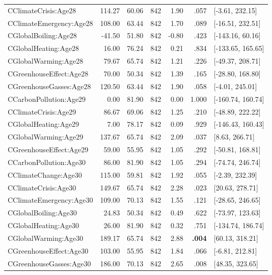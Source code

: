 \begin{table}[ht]
\begin{tabular}{lrrrrrl}
  CClimateCrisis:Age28 & 114.27 & 60.06 & 842 & 1.90 & .057 & [-3.61, 232.15] \\ 
  CClimateEmergency:Age28 & 108.00 & 63.44 & 842 & 1.70 & .089 & [-16.51, 232.51] \\ 
  CGlobalBoiling:Age28 & -41.50 & 51.80 & 842 & -0.80 & .423 & [-143.16, 60.16] \\ 
  CGlobalHeating:Age28 & 16.00 & 76.24 & 842 & 0.21 & .834 & [-133.65, 165.65] \\ 
  CGlobalWarming:Age28 & 79.67 & 65.74 & 842 & 1.21 & .226 & [-49.37, 208.71] \\ 
  CGreenhouseEffect:Age28 & 70.00 & 50.34 & 842 & 1.39 & .165 & [-28.80, 168.80] \\ 
  CGreenhouseGasses:Age28 & 120.50 & 63.44 & 842 & 1.90 & .058 & [-4.01, 245.01] \\ 
  CCarbonPollution:Age29 & 0.00 & 81.90 & 842 & 0.00 & 1.000 & [-160.74, 160.74] \\ 
  CClimateCrisis:Age29 & 86.67 & 69.06 & 842 & 1.25 & .210 & [-48.89, 222.22] \\ 
  CGlobalHeating:Age29 & 7.00 & 78.17 & 842 & 0.09 & .929 & [-146.43, 160.43] \\ 
  CGlobalWarming:Age29 & 137.67 & 65.74 & 842 & 2.09 & .037 & [8.63, 266.71] \\ 
  CGreenhouseEffect:Age29 & 59.00 & 55.95 & 842 & 1.05 & .292 & [-50.81, 168.81] \\ 
  CCarbonPollution:Age30 & 86.00 & 81.90 & 842 & 1.05 & .294 & [-74.74, 246.74] \\ 
  CClimateChange:Age30 & 115.00 & 59.81 & 842 & 1.92 & .055 & [-2.39, 232.39] \\ 
  CClimateCrisis:Age30 & 149.67 & 65.74 & 842 & 2.28 & .023 & [20.63, 278.71] \\ 
  CClimateEmergency:Age30 & 109.00 & 70.13 & 842 & 1.55 & .121 & [-28.65, 246.65] \\ 
  CGlobalBoiling:Age30 & 24.83 & 50.34 & 842 & 0.49 & .622 & [-73.97, 123.63] \\ 
  CGlobalHeating:Age30 & 26.00 & 81.90 & 842 & 0.32 & .751 & [-134.74, 186.74] \\ 
  CGlobalWarming:Age30 & 189.17 & 65.74 & 842 & 2.88 & \textbf{.004} & [60.13, 318.21] \\ 
  CGreenhouseEffect:Age30 & 103.00 & 55.95 & 842 & 1.84 & .066 & [-6.81, 212.81] \\ 
  CGreenhouseGasses:Age30 & 186.00 & 70.13 & 842 & 2.65 & .008 & [48.35, 323.65] \\ 

\end{tabular}
\end{table}
